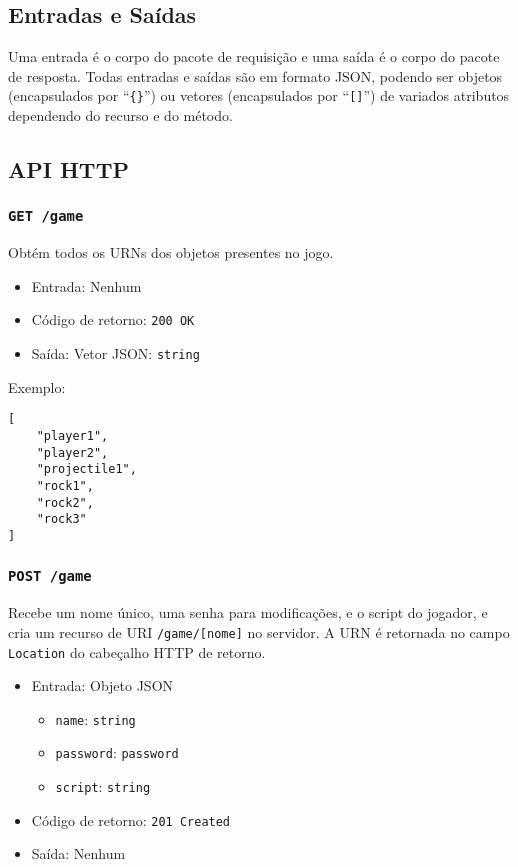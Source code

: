 \documentclass[12pt,a4paper]{article}
\begin{document}
\subsection{Entradas e Saídas}

Uma entrada é o corpo do pacote de requisição e uma saída é o corpo do pacote
de resposta. Todas entradas e saídas são em formato JSON, podendo ser objetos
(encapsulados por ``\texttt{\{\}}'') ou vetores (encapsulados por
``\texttt{[]}'') de variados atributos dependendo do recurso e do método.

\subsection{API HTTP}

\subsubsection{\texttt{GET /game}}

Obtém todos os URNs dos objetos presentes no jogo.

\begin{itemize}
	\item Entrada: Nenhum
	\item Código de retorno: \texttt{200 OK}
	\item Saída: Vetor JSON: \texttt{string}
\end{itemize}

Exemplo:

\begin{verbatim}
[
    "player1",
    "player2",
    "projectile1",
    "rock1",
    "rock2",
    "rock3"
]
\end{verbatim}

\subsubsection{\texttt{POST /game}}

Recebe um nome único, uma senha para modificações, e o script do jogador, e
cria um recurso de URI \texttt{/game/[nome]} no servidor. A URN é retornada no
campo \texttt{Location} do cabeçalho HTTP de retorno.

\begin{itemize}
	\item Entrada: Objeto JSON
		\begin{itemize}
			\item \texttt{name}: \texttt{string}
			\item \texttt{password}: \texttt{password}
			\item \texttt{script}: \texttt{string}
		\end{itemize}
	\item Código de retorno: \texttt{201 Created}
	\item Saída: Nenhum
\end{itemize}
\end{document}
